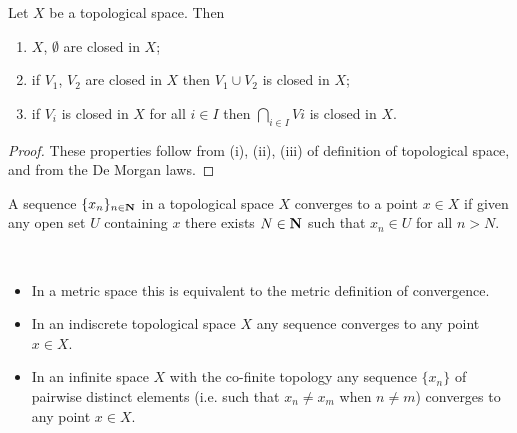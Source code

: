 \begin{proposition}
Let $X$ be a topological space. Then
\begin{enumerate}[label=(\roman*)]
\item $X$, $\emptyset$ are closed in $X$;
\item if $V_1$, $V_2$ are closed in $X$ then $V_1\cup V_2$ is closed in $X$;
\item if $V_i$ is closed in $X$ for all $i\in I$ then $\bigcap_{i\in I}Vi$ is closed in $X$.
\end{enumerate}
\end{proposition}

\begin{proof}
These properties follow from (i), (ii), (iii) of definition of topological space, and from the De Morgan laws.
\end{proof}

\begin{definition}
A sequence $\{x_n\}_{n\in\mathbf N}$ in a topological space $X$ converges to a point $x\in X$ if given any open set $U$ containing $x$ there exists $N\in\mathbf N$ such that $x_n\in U$ for all $n>N$.
\end{definition}

\begin{example} \
\begin{itemize}
\item In a metric space this is equivalent to the metric definition of convergence.
\item In an indiscrete topological space $X$ any sequence converges to any point $x\in X$.
\item In an infinite space $X$ with the co-finite topology any sequence $\{x_n\}$ of pairwise distinct elements (i.e. such that $x_n\neq x_m$ when $n\neq m$) converges to any point $x\in X$.
\end{itemize}
\end{example}




